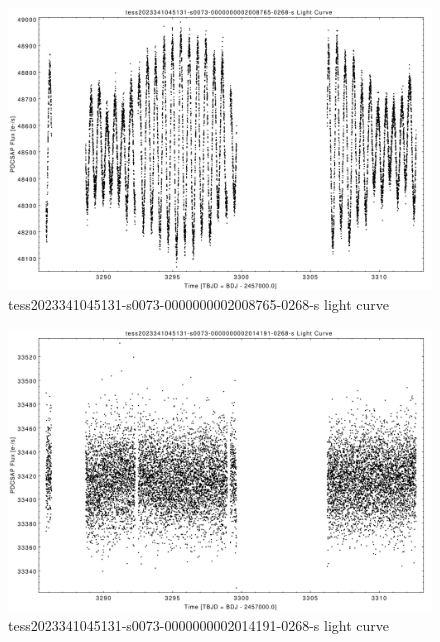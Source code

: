 \documentclass[a4paper,12pt]{article}
\begin{document}
\begin{figure}[htbp]
    \centering
    \includegraphics[width = 1\textwidth]{
      ../lightcurves/tess2023341045131-s0073-0000000002008765-0268-s.pdf}
    \caption{tess2023341045131-s0073-0000000002008765-0268-s light curve}
\end{figure}
\begin{figure}[htbp]
    \centering
    \includegraphics[width = 1\textwidth]{
      ../lightcurves/tess2023341045131-s0073-0000000002014191-0268-s.pdf}
    \caption{tess2023341045131-s0073-0000000002014191-0268-s light curve}
\end{figure}
\end{document}
